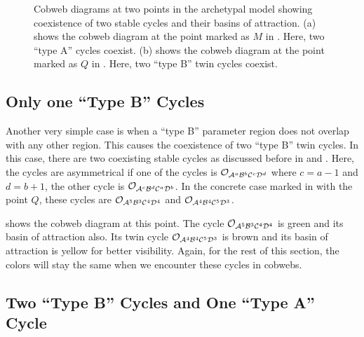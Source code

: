 \begin{figure}
	\centering
	\caption[Cobweb diagrams of the archetypal model showing coexistence of two cycles]{
		Cobweb diagrams at two points in the archetypal model showing coexistence of two stable cycles and their basins of attraction.
		(a) shows the cobweb diagram at the point marked as $M$ in .
		Here, two ``type A'' cycles coexist.
		(b) shows the cobweb diagram at the point marked as $Q$ in .
		Here, two ``type B'' twin cycles coexist.
	}
\end{figure}

\subsection{Only one ``Type B'' Cycles}

Another very simple case is when a ``type B'' parameter region does not overlap with any other region.
This causes the coexistence of two ``type B'' twin cycles.
In this case, there are two coexisting stable cycles as discussed before in  and .
Here, the cycles are asymmetrical if one of the cycles is $\mathcal{O}_{\mathcal{A}^a\mathcal{B}^b\mathcal{C}^c\mathcal{D}^d}$ where $c = a - 1$ and $d = b + 1$, the other cycle is $\mathcal{O}_{\mathcal{A}^c\mathcal{B}^d\mathcal{C}^a\mathcal{D}^b}$.
In the concrete case marked in  with the point $Q$, these cycles are $\mathcal{O}_{\mathcal{A}^5\mathcal{B}^3\mathcal{C}^4\mathcal{D}^4}$ and $\mathcal{O}_{\mathcal{A}^4\mathcal{B}^4\mathcal{C}^5\mathcal{D}^3}$.

 shows the cobweb diagram at this point.
The cycle $\mathcal{O}_{\mathcal{A}^5\mathcal{B}^3\mathcal{C}^4\mathcal{D}^4}$ is green and its basin of attraction also.
Its twin cycle $\mathcal{O}_{\mathcal{A}^4\mathcal{B}^4\mathcal{C}^5\mathcal{D}^3}$ is brown and its basin of attraction is yellow for better visibility.
Again, for the rest of this section, the colors will stay the same when we encounter these cycles in cobwebs.

\subsection{Two ``Type B'' Cycles and One ``Type A'' Cycle}
\label{sec:arch.coex.AB}

